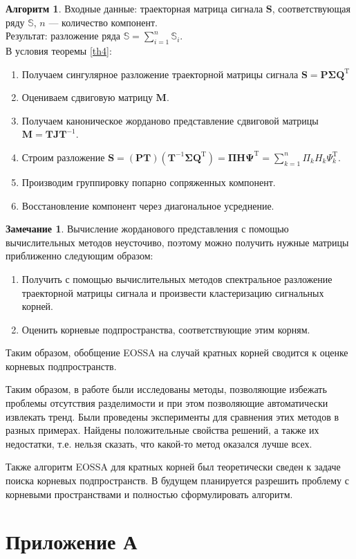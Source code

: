 \documentclass[specialist, substylefile = spbureport.rtx, subf,href,colorlinks=true, 12pt]{disser}
\theoremstyle{definition}
\newtheorem{algorithm}{Алгоритм}
\newtheorem{remark}{Замечание}
\begin{document}
\begin{algorithm}
Входные данные: траекторная матрица сигнала $\mathbf{S}$, соответствующая ряду $\mathbb{S}$, $n$ --- количество компонент.\\
Результат: разложение ряда $\mathbb{S} = \sum_{i = 1}^{n}\mathbb{S}_i$.\\
 В условия теоремы \ref{th4}:
\begin{enumerate}
            \item Получаем сингулярное разложение траекторной матрицы сигнала $\mathbf{S} = \mathbf{P\Sigma Q}^{\mathrm{T}}$
            \item Оцениваем сдвиговую матрицу $\mathbf{M}$.
            \item Получаем каноническое жорданово представление сдвиговой матрицы $\mathbf{M} = \mathbf{TJ}\mathbf{T}^{-1}$.
            \item Строим разложение $\mathbf{S} = (\mathbf{PT})(\mathbf{T}^{-1}\mathbf{\Sigma Q}^{\mathrm{T}}) = \mathbf{\Pi H \Psi}^{\mathrm{T}} = \sum_{k = 1}^{n}\Pi_k H_k\Psi^{\mathrm{T}}_k$.
            \item Производим группировку попарно сопряженных компонент.
            \item Восстановление компонент через диагональное усреднение.
        \end{enumerate}
\end{algorithm}

\begin{remark}
 Вычисление жорданового представления с помощью вычислительных методов неусточиво, поэтому можно получить нужные матрицы приближенно следующим образом:
 \begin{enumerate}
     \item Получить с помощью вычислительных методов спектральное разложение траекторной матрицы сигнала и произвести кластеризацию сигнальных корней.
     \item Оценить корневые подпространства, соответствующие этим корням.
 \end{enumerate}
 Таким образом, обобщение EOSSA на случай кратных корней сводится к оценке корневых подпространств.
\end{remark}

\conclusion

Таким образом, в работе были исследованы методы, позволяющие избежать проблемы отсутствия разделимости и при этом позволяющие автоматически извлекать тренд. Были проведены эксперименты для сравнения этих методов в разных примерах. Найдены положительные свойства решений, а также их недостатки, т.е. нельзя сказать, что какой-то метод оказался лучше всех.

Также алгоритм EOSSA для кратных корней был теоретически сведен к задаче поиска корневых подпространств. В будущем планируется разрешить проблему с корневыми пространствами и полностью сформулировать алгоритм.





\chapter{Приложение А}
\end{document}
